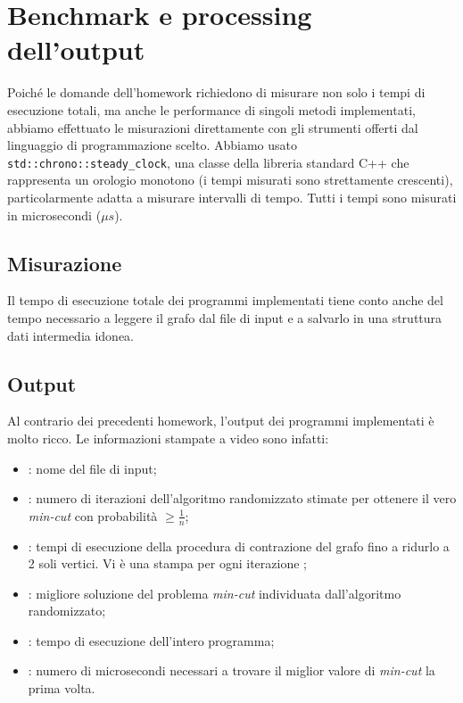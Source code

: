\section{Benchmark e processing dell'output}
\label{cap:benchmark-process}

Poiché le domande dell'homework richiedono di misurare non solo i tempi di esecuzione totali, ma anche le performance
di singoli metodi implementati, abbiamo effettuato le misurazioni direttamente con gli strumenti offerti dal linguaggio di programmazione scelto. Abbiamo usato \texttt{std::chrono::steady_clock}, una classe della libreria standard C++ che rappresenta un orologio monotono (i tempi misurati sono strettamente crescenti), particolarmente adatta a misurare intervalli di tempo. Tutti i tempi sono misurati in microsecondi ($\mu{}s$). \\

\subsection{Misurazione}

Il tempo di esecuzione totale dei programmi implementati tiene conto anche del tempo necessario a leggere il grafo dal file di input e a salvarlo in una struttura dati intermedia idonea.

\subsection{Output}
\label{sub:output}

Al contrario dei precedenti homework, l'output dei programmi implementati è molto ricco. Le informazioni stampate a video sono infatti:

\begin{itemize}
    \item {}: nome del file di input;
    \item {}: numero di iterazioni dell'algoritmo randomizzato stimate per ottenere il vero \textit{min-cut} con probabilità $\geq \frac{1}{n}$;
    \item {}: tempi di esecuzione della procedura di contrazione del grafo fino a ridurlo a 2 soli vertici. Vi è una stampa per ogni iterazione ;
    \item {}: migliore soluzione del problema \textit{min-cut} individuata dall'algoritmo randomizzato;
    \item {}: tempo di esecuzione dell'intero programma;
    \item {}: numero di microsecondi necessari a trovare il miglior valore di \textit{min-cut} la prima volta.
\end{itemize}

